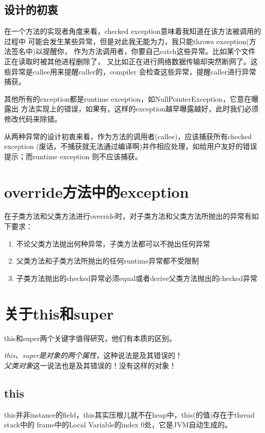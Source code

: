 \documentclass[a4paper,11pt]{article}
\begin{document}
\subsection[设计的初衷]{设计的初衷}
在一个方法的实现者角度来看，checked exception意味着我知道在该方法被调用的过程中
可能会发生某些异常，但是对此我无能为力，我只能throws exception(方法签名中)以提醒你，
作为方法调用者，你要自己catch这些异常。比如某个文件正在读取时被其他进程删除了，
又比如正在进行网络数据传输却突然断网了。这些异常是callee用来提醒caller的，compiler
会检查这些异常，提醒caller进行异常捕获。

其他所有的exception都是runtime exception，如NullPointerException，它意在曝露出
方法实现上的错误，如果有，这样的exception越早曝露越好，此时我们必须修改代码来除错。

从两种异常的设计初衷来看，作为方法的调用者(callee)，应该捕获所有checked exception
(废话，不捕获就无法通过编译啊)并作相应处理，如给用户友好的错误提示；而runtime exception
则不应该捕获。

\section[override方法中的exception]{override方法中的exception}
\label{sec:exceptions-in-override}
在子类方法和父类方法进行override时，对子类方法和父类方法所抛出的异常有如下要求：

\begin{enumerate}
  \item 不论父类方法抛出何种异常，子类方法都可以不抛出任何异常
  \item 父类方法和子类方法所抛出的任何runtime异常都不受限制
  \item 子类方法抛出的checked异常必须equal或者derive父类方法抛出的checked异常
\end{enumerate}

\section[关于this和super]{关于this和super}
this和super两个关键字值得研究，他们有本质的区别。

\emph{this、super是对象的两个属性}，这种说法是及其错误的！\\
\emph{父类对象}这一说法也是及其错误的！没有这样的对象！

\subsection[this]{this}
this并非instance的field，this其实压根儿就不在heap中，this(的值)存在于thread stack中的
frame中的Local Variable的index 0处，它是JVM自动生成的。
\end{document}
